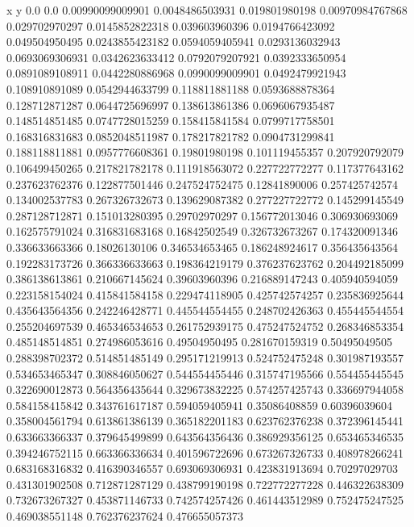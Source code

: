               x                y
            0.0              0.0
0.00990099009901  0.0048486503931
 0.019801980198  0.00970984767868
 0.029702970297  0.0145852822318
 0.039603960396  0.0194766423092
 0.049504950495  0.0243855423182
0.0594059405941  0.0293136032943
0.0693069306931  0.0342623633412
0.0792079207921  0.0392333650954
0.0891089108911  0.0442280886968
0.0990099009901  0.0492479921943
 0.108910891089  0.0542944633799
 0.118811881188  0.0593688878364
 0.128712871287  0.0644725696997
 0.138613861386  0.0696067935487
 0.148514851485  0.0747728015259
 0.158415841584  0.0799717758501
 0.168316831683  0.0852048511987
 0.178217821782  0.0904731299841
 0.188118811881  0.0957776608361
  0.19801980198   0.101119455357
 0.207920792079   0.106499450265
 0.217821782178   0.111918563072
 0.227722772277   0.117377643162
 0.237623762376   0.122877501446
 0.247524752475    0.12841890006
 0.257425742574   0.134002537783
 0.267326732673   0.139629087382
 0.277227722772   0.145299145549
 0.287128712871   0.151013280395
  0.29702970297   0.156772013046
 0.306930693069   0.162575791024
 0.316831683168    0.16842502549
 0.326732673267   0.174320091346
 0.336633663366    0.18026130106
 0.346534653465   0.186248924617
 0.356435643564   0.192283173726
 0.366336633663   0.198364219179
 0.376237623762   0.204492185099
 0.386138613861   0.210667145624
  0.39603960396   0.216889147243
 0.405940594059   0.223158154024
 0.415841584158   0.229474118905
 0.425742574257   0.235836925644
 0.435643564356   0.242246428771
 0.445544554455   0.248702426363
 0.455445544554   0.255204697539
 0.465346534653   0.261752939175
 0.475247524752   0.268346853354
 0.485148514851   0.274986053616
  0.49504950495   0.281670159319
  0.50495049505   0.288398702372
 0.514851485149   0.295171219913
 0.524752475248   0.301987193557
 0.534653465347   0.308846050627
 0.544554455446   0.315747195566
 0.554455445545   0.322690012873
 0.564356435644   0.329673832225
 0.574257425743   0.336697944058
 0.584158415842   0.343761617187
 0.594059405941    0.35086408859
  0.60396039604   0.358004561794
 0.613861386139   0.365182201183
 0.623762376238   0.372396145441
 0.633663366337   0.379645499899
 0.643564356436   0.386929356125
 0.653465346535   0.394246752115
 0.663366336634   0.401596722696
 0.673267326733   0.408978266241
 0.683168316832   0.416390346557
 0.693069306931   0.423831913694
  0.70297029703   0.431301902508
 0.712871287129   0.438799190198
 0.722772277228   0.446322638309
 0.732673267327   0.453871146733
 0.742574257426   0.461443512989
 0.752475247525   0.469038551148
 0.762376237624   0.476655057373
